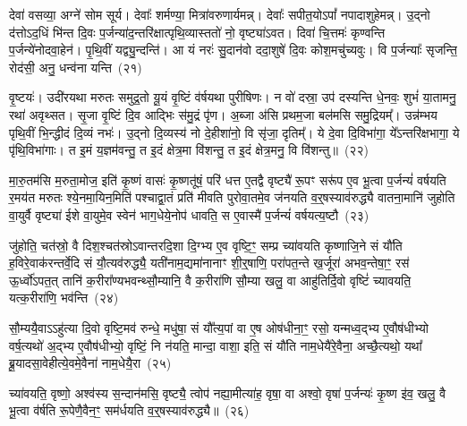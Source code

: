 {\anuvakamend[{पू॒र्तिरा॒वृद्द्विच॑त्वारिꣳशच्च}]}%

देवा॑ वसव्या॒ अग्ने॑ सोम सूर्य। देवाः᳚ शर्मण्या॒ मित्रा॑वरुणार्यमन्न्। देवाः᳚ सपीत॒यो\-ऽपां᳚ नपादाशुहेमन्न्। उ॒द्नो द॑त्तो\-ऽद॒धिं भि॑न्त दि॒वः प॒र्जन्या॑द॒न्तरि॑क्षात्पृथि॒व्यास्ततो॑ नो॒ वृष्ट्या॑\-ऽवत। दिवा॑ चि॒त्तमः॑ कृण्वन्ति प॒र्जन्ये॑नोदवा॒हेन॑। पृ॒थि॒वीं यद्व्यु॒न्दन्ति॑। आ यं नरः॑ सु॒दान॑वो ददा॒शुषे॑ दि॒वः कोश॒मचु॑च्यवुः। वि प॒र्जन्याः᳚ सृजन्ति॒ रोद॑सी॒ अनु॒ धन्व॑ना यन्ति~(२१)

वृ॒ष्टयः॑। उदी॑रयथा मरुतः समुद्र॒तो यू॒यं वृ॒ष्टिं व॑र्\mbox{}षयथा पुरीषिणः। न वो॑ दस्रा॒ उप॑ दस्यन्ति धे॒नवः॒ शुभं॑ या॒तामनु॒ रथा॑ अवृथ्सत। सृ॒जा वृ॒ष्टिं दि॒व आद्भिः स॑मु॒द्रं पृ॑ण। अ॒ब्जा अ॑सि प्रथम॒जा बल॑मसि समु॒द्रियम्᳚। उन्न॑म्भय पृथि॒वीं भि॒न्द्धीदं दि॒व्यं नभः॑। उ॒द्नो दि॒व्यस्य॑ नो दे॒हीशा॑नो॒ वि सृ॑जा॒ दृतिम्᳚। ये दे॒वा दि॒विभा॑गा॒ ये᳚\-ऽन्तरि॑क्षभागा॒ ये पृ॑थि॒विभा॑गाः। त इ॒मं य॒ज्ञम॑वन्तु॒ त इ॒दं क्षेत्र॒मा वि॑शन्तु॒ त इ॒दं क्षेत्र॒मनु॒ वि वि॑शन्तु॥~(२२)

{\anuvakamend[{य॒न्ति॒ दे॒वा विꣳ॑शति॒श्च॑}]}%

मा॒रु॒तम॑सि म॒रुता॒मोज॒ इति॑ कृ॒ष्णं वासः॑ कृ॒ष्णतू॑षं॒ परि॑ धत्त ए॒तद्वै वृष्ट्यै॑ रू॒पꣳ सरू॑प ए॒व भू॒त्वा प॒र्जन्यं॑ वर्\mbox{}षयति र॒मय॑त मरुतः श्ये॒नमा॒यिन॒मिति॑ पश्चाद्वा॒तं प्रति॑ मीवति पुरोवा॒तमे॒व ज॑नयति व॒र्॒\mbox{}षस्याव॑रुद्ध्यै वातना॒मानि॑ जुहोति वा॒युर्वै वृष्ट्या॑ ईशे वा॒युमे॒व स्वेन॑ भाग॒धेये॒नोप॑ धावति॒ स ए॒वास्मै॑ प॒र्जन्यं॑ वर्\mbox{}षयत्य॒ष्टौ~(२३)

जु॑होति॒ चत॑स्रो॒ वै दिश॒श्चत॑स्रो\-ऽवान्तरदि॒शा दि॒ग्भ्य ए॒व वृष्टि॒ꣳ॒ सम्प्र च्या॑वयति कृष्णाजि॒ने सं यौ॑ति ह॒विरे॒वाक॑रन्तर्वे॒दि सं यौ॒त्यव॑रुद्ध्यै॒ यती॑नाम॒द्यमा॑नानाꣳ शी॒र्॒\mbox{}षाणि॒ परा॑पत॒न्ते ख॒र्जूरा॑ अभव॒न्तेषा॒ꣳ॒ रस॑ ऊ॒र्ध्वो॑\-ऽपत॒त् तानि॑ क॒रीरा᳚ण्यभवन्थ्सौ॒म्यानि॒ वै क॒रीरा॑णि सौ॒म्या खलु॒ वा आहु॑तिर्दि॒वो वृष्टिं॑ च्यावयति॒ यत्क॒रीरा॑णि॒ भव॑न्ति~(२४)

सौ॒म्ययै॒वा\-ऽऽ\-हु॑त्या दि॒वो वृष्टि॒मव॑ रुन्धे॒ मधु॑षा॒ सं यौ᳚त्य॒पां वा ए॒ष ओष॑धीना॒ꣳ॒ रसो॒ यन्मध्व॒द्भ्य ए॒वौष॑धीभ्यो वर्\mbox{}ष॒त्यथो॑ अ॒द्भ्य ए॒वौष॑धीभ्यो॒ वृष्टिं॒ नि न॑यति॒ मान्दा॒ वाशा॒ इति॒ सं यौ॑ति नाम॒धेयै॑रे॒वैना॒ अच्छै॒त्यथो॒ यथा᳚ ब्रू॒यादसा॒वेहीत्ये॒वमे॒वैना॑ नाम॒धेयै॒रा~(२५)

च्या॑वयति॒ वृष्णो॒ अश्व॑स्य स॒न्दान॑मसि॒ वृष्ट्यै॒ त्वोप॑ नह्या॒मीत्या॑ह॒ वृषा॒ वा अश्वो॒ वृषा॑ प॒र्जन्यः॑ कृ॒ष्ण इ॑व॒ खलु॒ वै भू॒त्वा व॑र्\mbox{}षति रू॒पेणै॒वैन॒ꣳ॒ सम॑र्धयति व॒र्॒\mbox{}षस्याव॑रुद्ध्यै॥~(२६)

{\anuvakamend[{अ॒ष्टौ भव॑न्ति नाम॒धेयै॒रैका॒न्नत्रि॒ꣳ॒शच्च॑}]}%

